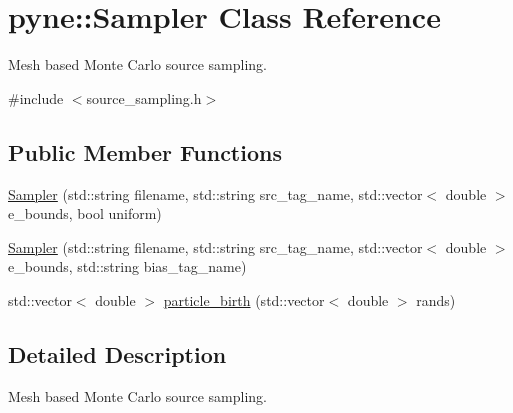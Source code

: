 \hypertarget{classpyne_1_1_sampler}{\section{pyne\-:\-:Sampler Class Reference}
\label{classpyne_1_1_sampler}
}


Mesh based Monte Carlo source sampling.  




{\ttfamily \#include $<$source\-\_\-sampling.\-h$>$}

\subsection*{Public Member Functions}
\begin{DoxyCompactItemize}
\item 
\hyperlink{classpyne_1_1_sampler_a57e096205922e6a221f2185a9849c5ed}{Sampler} (std\-::string filename, std\-::string src\-\_\-tag\-\_\-name, std\-::vector$<$ double $>$ e\-\_\-bounds, bool uniform)
\item 
\hyperlink{classpyne_1_1_sampler_a058411845da467ff7421956ba076ac31}{Sampler} (std\-::string filename, std\-::string src\-\_\-tag\-\_\-name, std\-::vector$<$ double $>$ e\-\_\-bounds, std\-::string bias\-\_\-tag\-\_\-name)
\item 
std\-::vector$<$ double $>$ \hyperlink{classpyne_1_1_sampler_aa5d177ee74199617fc08e4a7a7686e8f}{particle\-\_\-birth} (std\-::vector$<$ double $>$ rands)
\end{DoxyCompactItemize}


\subsection{Detailed Description}
Mesh based Monte Carlo source sampling. 

